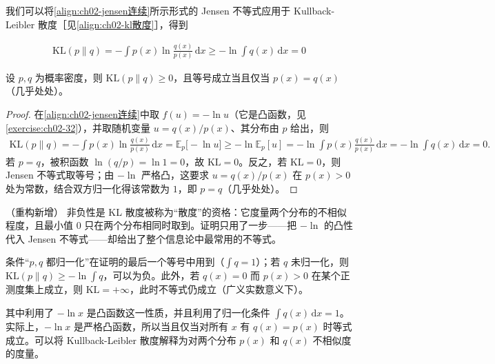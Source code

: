 \documentclass[../../main.tex]{subfiles}
\begin{document}
我们可以将\eqref{align:ch02-jensen连续}所示形式的 Jensen 不等式应用于 Kullback-Leibler 散度［见\eqref{align:ch02-kl散度}］，得到

\begin{align}
  \mathrm{KL}(p\|q) = -\int p(x)\ln\frac{q(x)}{p(x)}\,\mathrm{d}x \geqslant -\ln\int q(x)\,\mathrm{d}x = 0
  \label{align:ch02-kl非负}
\end{align}

\begin{proposition}[KL 散度的非负性]\label{proposition:ch02-kl非负}
设 $p,q$ 为概率密度，则 $\mathrm{KL}(p\|q)\geqslant0$，且等号成立当且仅当 $p(x)=q(x)$（几乎处处）。
\end{proposition}

\begin{proof}
在\eqref{align:ch02-jensen连续}中取 $f(u)=-\ln u$（它是凸函数，见\cref{exercise:ch02-32}），并取随机变量 $u=q(x)/p(x)$、其分布由 $p$ 给出，则
\begin{align*}
  \mathrm{KL}(p\|q) = -\int p(x)\ln\frac{q(x)}{p(x)}\,\mathrm{d}x
  = \mathbb{E}_p\big[-\ln u\big]
  \geqslant -\ln\mathbb{E}_p[u]
  = -\ln\int p(x)\frac{q(x)}{p(x)}\,\mathrm{d}x = -\ln\int q(x)\,\mathrm{d}x = 0 .
\end{align*}
若 $p=q$，被积函数 $\ln(q/p)=\ln1=0$，故 $\mathrm{KL}=0$。反之，若 $\mathrm{KL}=0$，则 Jensen 不等式取等号；由 $-\ln$ 严格凸，这要求 $u=q(x)/p(x)$ 在 $p(x)>0$ 处为常数，结合双方归一化得该常数为 $1$，即 $p=q$（几乎处处）。
\end{proof}

\begin{remark}（重构新增）
非负性是 KL 散度被称为“散度”的资格：它度量两个分布的不相似程度，且最小值 $0$ 只在两个分布相同时取到。证明只用了一步——把 $-\ln$ 的凸性代入 Jensen 不等式——却给出了整个信息论中最常用的不等式。

条件“$p,q$ 都归一化”在证明的最后一个等号中用到（$\int q=1$）；若 $q$ 未归一化，则 $\mathrm{KL}(p\|q)\geqslant-\ln\int q$，可以为负。此外，若 $q(x)=0$ 而 $p(x)>0$ 在某个正测度集上成立，则 $\mathrm{KL}=+\infty$，此时不等式仍成立（广义实数意义下）。
\end{remark}

其中利用了 $-\ln x$ 是凸函数这一性质，并且利用了归一化条件 $\int q(x)\,\mathrm{d}x=1$。实际上，$-\ln x$ 是严格凸函数，所以当且仅当对所有 $x$ 有 $q(x)=p(x)$ 时等式成立。可以将 Kullback-Leibler 散度解释为对两个分布 $p(x)$ 和 $q(x)$ 不相似度的度量。
\end{document}
